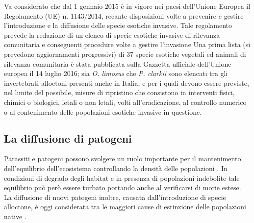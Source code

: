 \documentclass[11pt,a4paper,italian,twoside,openany]{memoir}
\begin{document}
Va considerato che dal 1 gennaio 2015 è in vigore nei paesi dell'Unione Europea il Regolamento (UE) n. 1143/2014, recante disposizioni volte a prevenire e gestire l'introduzione e la diffusione delle specie esotiche invasive. Tale regolamento prevede la redazione di un elenco di specie esotiche invasive di rilevanza comunitaria e conseguenti procedure volte a gestire l'invasione Una prima lista (si prevedono aggiornamenti progressivi) di 37 specie esotiche vegetali ed animali di rilevanza comunitaria è stata pubblicata sulla Gazzetta ufficiale dell'Unione europea il 14 luglio 2016; sia \emph{O. limosus} che \emph{P. clarkii} sono elencati tra gli invertebrati alloctoni presenti anche in Italia, e per i quali devono essere previste, nel limite del possibile, misure di ripristino che consistono in interventi fisici, chimici o biologici, letali o non letali, volti all'eradicazione, al controllo numerico o al contenimento delle popolazioni esotiche invasive in questione.

\subsection{La diffusione di patogeni}
\label{subsec_diffusionepat}
Parassiti e patogeni possono svolgere un ruolo importante per il mantenimento dell'equilibrio dell'ecosistema controllando la densità delle popolazioni \cite{Vogt 1999}. In condizioni di degrado degli habitat e in presenza di popolazioni indebolite tale equilibrio può però essere turbato portando anche al verificarsi di morie estese. La diffusione di nuovi patogeni inoltre, causata dall'introduzione di specie alloctone, è oggi considerata tra le maggiori cause di estinzione delle popolazioni native \cite{Pockl 2002} \cite{Fureder 2006} \cite{Brusconi 2008} \cite{Aquiloni 2010}.
\end{document}
